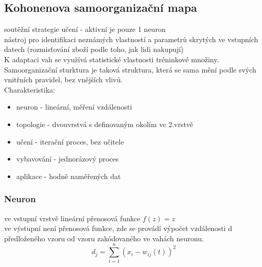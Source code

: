 \subsection{Kohonenova samoorganizační mapa}
soutěžní strategie učení - aktivní je pouze 1 neuron\\
nástroj pro identifikaci neznámých vlastností a parametrů skrytých ve vstupních datech (rozmisťování zboží podle toho, jak lidi nakupují)\\
K adaptaci vah se využívá statistické vlastnosti tréninkové množiny.\\
Samoorganizační sturktura je taková struktura, která se sama mění podle svých vnitřních pravidel, bez vnějších vlivů.\\
Charakteristika:
\begin{itemize}
    \item neuron - lineární, měření vzdálenosti
    \item topologie - dvouvrstvá s definovaným okolím ve 2.vrstvě
    \item učení - iterační proces, bez učitele
    \item vybavování - jednorázový proces
    \item aplikace - hodně naměřených dat
\end{itemize}
\subsubsection{Neuron}
ve vstupní vrstvě lineární přenosová funkce \(f(z) = z\)\\
ve výstupní není přenosová funkce, zde se provádí výpočet vzdálenosti d předloženého vzoru od vzoru zakódovaného ve vahách neuronu.
\begin{equation}
    d_j = \sum^n_{i=1} \left(x_i - w_{ij}(t)\right)^2
\end{equation}

